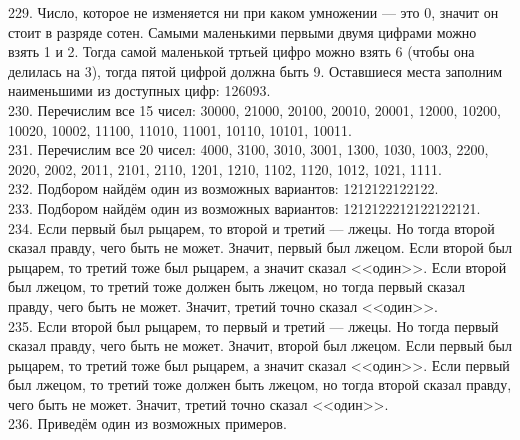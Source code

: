 \documentclass[12pt]{article}
\begin{document}
229. Число, которое не изменяется ни при каком умножении --- это 0, значит он стоит в разряде сотен. Самыми маленькими первыми двумя цифрами можно взять 1 и 2. Тогда самой маленькой тртьей цифро можно взять 6 (чтобы она делилась на 3), тогда пятой цифрой должна быть 9. Оставшиеся места заполним наименьшими из доступных цифр: 126093.\\
230. Перечислим все 15 чисел: 30000, 21000, 20100, 20010, 20001, 12000, 10200, 10020, 10002, 11100, 11010, 11001, 10110, 10101, 10011.\\
231. Перечислим все 20 чисел: 4000, 3100, 3010, 3001, 1300, 1030, 1003, 2200, 2020, 2002, 2011, 2101, 2110, 1201, 1210, 1102, 1120, 1012, 1021, 1111.\\
232. Подбором найдём один из возможных вариантов: 1212122122122.\\
233. Подбором найдём один из возможных вариантов: 1212122212122122121.\\
234. Если первый был рыцарем, то второй и третий --- лжецы. Но тогда второй сказал правду, чего быть не может. Значит, первый был лжецом. Если второй был рыцарем, то третий тоже был рыцарем, а значит сказал <<один>>. Если второй был лжецом, то третий тоже должен быть лжецом, но тогда первый сказал правду, чего быть не может. Значит, третий точно сказал <<один>>.\\
235. Если второй был рыцарем, то первый и третий --- лжецы. Но тогда первый сказал правду, чего быть не может. Значит, второй был лжецом. Если первый был рыцарем, то третий тоже был рыцарем, а значит сказал <<один>>. Если первый был лжецом, то третий тоже должен быть лжецом, но тогда второй сказал правду, чего быть не может. Значит, третий точно сказал <<один>>.\\
236. Приведём один из возможных примеров.
\begin{center}
\begin{figure}[ht!]
\end{figure}
\end{center}
\end{document}
